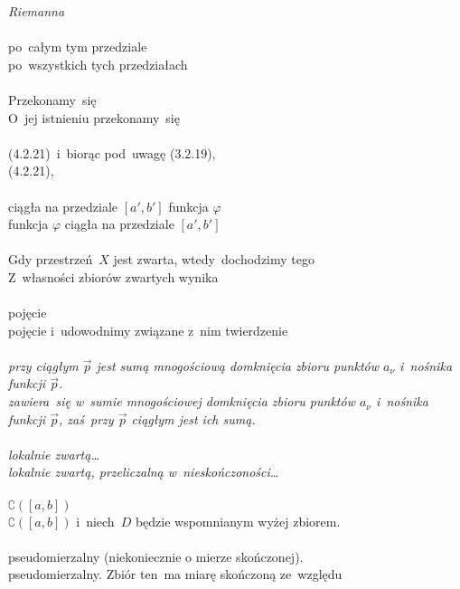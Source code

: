 \documentclass[a4paper,11pt]{article}
\begin{document}
\Powin \textit{Riemanna} \\
 \\
\Jest  po~całym tym przedziale \\
\Powin po~wszystkich tych przedziałach \\
 \\
\Jest Przekonamy~się \\
\Powin  O~jej istnieniu przekonamy~się \\
 \\
\Jest (4.2.21)~i~biorąc pod~uwagę (3.2.19), \\
\Powin (4.2.21), \\
 \\
\Jest ciągła na przedziale $[ a', b' ]$ funkcja $\varphi$ \\
\Powin  funkcja $\varphi$ ciągła na przedziale $[ a', b' ]$ \\
 \\
\Jest Gdy przestrzeń~$X$ jest zwarta, wtedy~dochodzimy tego \\
\Powin  Z~własności zbiorów zwartych wynika \\
 \\
\Jest pojęcie \\
\Powin  pojęcie i~udowodnimy związane z~nim twierdzenie \\
 \\
\Jest \textit{przy ciągłym $\vec{ p }$ jest sumą mnogościową domknięcia
  zbioru punktów $a_{ \nu }$ i~nośnika
  funkcji $\vec{ p }$.} \\
\Powin \textit{zawiera~się w~sumie mnogościowej domknięcia zbioru
  punktów $a_{ \nu }$ i~nośnika funkcji $\vec{ p }$, zaś~przy
  $\vec{ p }$
  ciągłym jest ich sumą.} \\
 \\
\Jest  \textit{lokalnie zwartą\ldots} \\
\Powin \textit{lokalnie zwartą, przeliczalną w~nieskończoności\ldots} \\
 \\
\Jest $\complement ( [ a, b ] )$ \\
\Powin $\complement ( [ a, b ] )$ i~niech~$D$ będzie wspomnianym wyżej
zbiorem. \\
 \\
\Jest pseudomierzalny (niekoniecznie o mierze skończonej). \\
\Powin pseudomierzalny. Zbiór ten~ma miarę skończoną ze~względu
\end{document}
